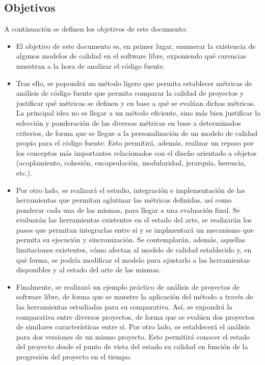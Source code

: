 \documentclass[11pt]{article}
\begin{document}
\subsection{Objetivos}
A continuación se definen los objetivos de este documento:
\begin{itemize}
\item{El objetivo de este documento es, en primer lugar, enumerar la existencia de algunos modelos de calidad en el software libre, exponiendo qué carencias muestran a la hora de analizar el código fuente}.
\item{Tras ello, se popondrá un método ligero que permita establecer métricas de análisis de código fuente que permita comparar la calidad de proyectos y justificar qué métricas se definen y en base a qué se evalúan dichas métricas. La principal idea no es llegar a un método eficiente, sino más bien justificar la selección y ponderación de las diversas métricas en base a determinados criterios, de forma que se llegue a la personalización de un modelo de calidad propio para el código fuente. Esto permitirá, además, realizar un repaso por los conceptos más importantes relacionados con el diseño orientado a objetos (acoplamiento, cohesión, encapsulación, modularidad, jerarquía, herencia, etc.)}.
\item{Por otro lado, se realizará el estudio, integración e implementación de las herramientas que permitan aglutinar las métricas definidas, así como ponderar cada una de las mismas, para llegar a una evaluación final. Se evaluarán las herramientas existentes en el estado del arte, se realizarán los pasos que permitan integrarlas entre sí y se implmentará un mecanismo que permita su ejecución y sincronización. Se contemplarán, además, aquellas limitaciones existentes, cómo afectan al modelo de calidad establecido y, en qué forma, se podría modificar el modelo para ajustarlo a las herramientas disponibles y al estado del arte de las mismas}.
\item{Finalmente, se realizará un ejemplo práctico de análisis de proyectos de software libre, de forma que se muestre la aplicación del método a través de las herramientas estudiadas para su comparativa. Así, se expondrá la comparativa entre diversos proyectos, de forma que se evalúen dos proyectos de similares características entre sí. Por otro lado, se establecerá el análisis para dos versiones de un mismo proyecto. Esto permitirá conocer el estado del proyecto desde el punto de vista del estado su calidad en función de la progresión del proyecto en el tiempo}.
\end{itemize}
\end{document}
